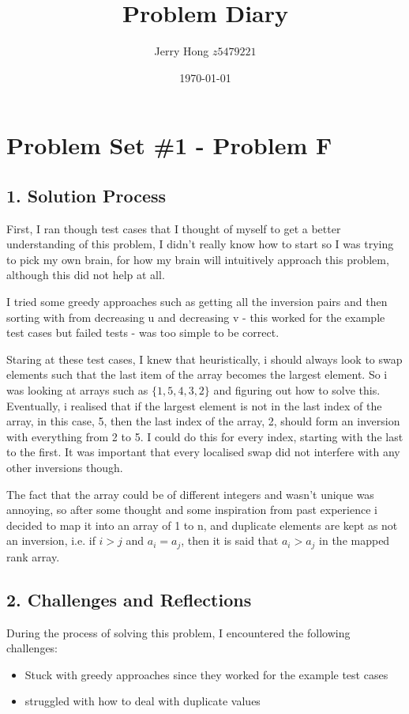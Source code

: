 \documentclass[a4paper,12pt]{article}
\title{Problem Diary}
\author{Jerry Hong $z5479221$}
\date{\today}
\begin{document}
\maketitle

\section*{Problem Set \#1 - Problem F}

\subsection*{1. Solution Process}
First, I ran though test cases that I thought of myself to get a better understanding of this problem, I didn't really know how to start so I was trying to pick my own brain, for how my brain will intuitively approach this problem, although this did not help at all.

I tried some greedy approaches such as getting all the inversion pairs and then sorting with from decreasing u and decreasing v - this worked for the example test cases but failed tests - was too simple to be correct.

Staring at these test cases, I knew that heuristically, i should always look to swap elements such that the last item of the array becomes the largest element. So i was looking at arrays such as $\{1,5,4,3,2\}$ and figuring out how to solve this. Eventually, i realised that if the largest element is not in the last index of the array, in this case, 5, then the last index of the array, 2, should form an inversion with everything from 2 to 5. I could do this for every index, starting with the last to the first. It was important that every localised swap did not interfere with any other inversions though.

The fact that the array could be of different integers and wasn't unique was annoying, so after some thought and some inspiration from past experience i decided to map it into an array of 1 to n, and duplicate elements are kept as not an inversion, i.e. if $i > j$ and $a_i = a_j$, then it is said that $a_i > a_j$ in the mapped rank array.



\subsection*{2. Challenges and Reflections}
During the process of solving this problem, I encountered the following challenges:
\begin{itemize}
    \item Stuck with greedy approaches since they worked for the example test cases
    \item struggled with how to deal with duplicate values
\end{itemize}
\end{document}
